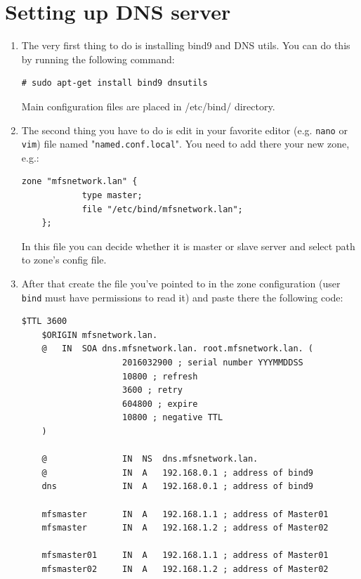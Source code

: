 \documentclass[a4paper,11pt,english]{report}
\def\code#1{\texttt{#1}}
\begin{document}
		\section{Setting up DNS server}
			\begin{enumerate}
				\item The very first thing to do is installing bind9 and DNS utils. You can do this by running the following command:
					
					\begin{lstlisting}[caption={installing bind9}]
	# sudo apt-get install bind9 dnsutils
					\end{lstlisting}
					
					Main configuration files are placed in /etc/bind/ directory.
					
				\item The second thing you have to do is edit in your favorite editor (e.g. \code{nano} or \code{vim}) file named "\code{named.conf.local}". You need to add there your new zone, e.g.:
			
					\begin{lstlisting}[caption={New zone in named.conf.local}]
	zone "mfsnetwork.lan" {
	        type master;
	        file "/etc/bind/mfsnetwork.lan";
	};
					\end{lstlisting}
					
					In this file you can decide whether it is master or slave server and select path to zone's config file.
					
				\item After that create the file you've pointed to in the zone configuration (user \code{bind} must have permissions to read it) and paste there the following code:
					
					\begin{lstlisting}[caption={mfsnetwork.lan configuration file}]
	$TTL 3600
	$ORIGIN mfsnetwork.lan.
	@	IN	SOA	dns.mfsnetwork.lan.	root.mfsnetwork.lan. (
					2016032900 ; serial number YYYMMDDSS
					10800 ; refresh
					3600 ; retry
					604800 ; expire
					10800 ; negative TTL
	)
	
	@				IN	NS	dns.mfsnetwork.lan.
	@				IN	A	192.168.0.1 ; address of bind9
	dns				IN	A	192.168.0.1 ; address of bind9
	
	mfsmaster		IN	A	192.168.1.1 ; address of Master01
	mfsmaster		IN	A	192.168.1.2 ; address of Master02
	
	mfsmaster01		IN	A	192.168.1.1 ; address of Master01
	mfsmaster02		IN	A	192.168.1.2 ; address of Master02
		

\end{lstlisting}
\end{enumerate}
\end{document}
